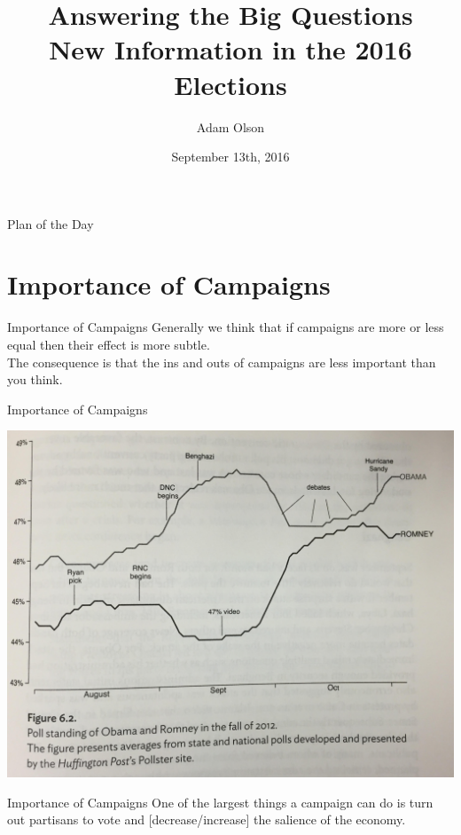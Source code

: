 \documentclass{beamer}
\title[Big Questions]{Answering the Big Questions \\ New Information in the 2016 Elections}
\author[Adam Olson]{Adam Olson}
\date{September 13th, 2016}
\begin{document}
\begin{frame}
	\titlepage
\end{frame}
\begin{frame}{Plan of the Day}
\tableofcontents
\end{frame}
\section{Importance of Campaigns}
\begin{frame}{Importance of Campaigns}
Generally we think that if campaigns are more or less equal then their effect is more subtle.\\
\medskip
The consequence is that the ins and outs of campaigns are less important than you think.
\end{frame}
\begin{frame}{Importance of Campaigns}
\begin{center}
\includegraphics[width=.9\textwidth]{gaffes}
\end{center}
\end{frame}
\begin{frame}{Importance of Campaigns}
One of the largest things a campaign can do is turn out partisans to vote and [decrease/increase] the salience of the economy.
\end{frame}
\end{document}
